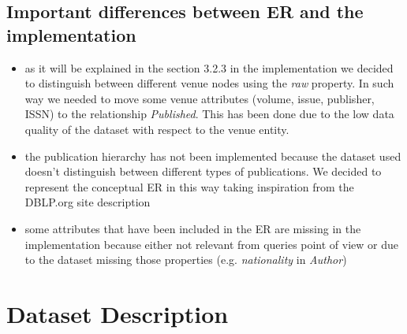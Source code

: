 \documentclass{Configuration_Files/PoliMi3i_thesis}
\begin{document}
\section{Important differences between ER and the implementation}
\begin{itemize}
    \item as it will be explained in the section 3.2.3 in the implementation we decided to distinguish between different venue
            nodes using the \emph{raw} property. In such way we needed to move some venue attributes (volume, issue, publisher, ISSN)
            to the relationship \emph{Published}. This has been done due to the low data quality of the dataset with respect to the venue entity.
    \item the publication hierarchy has not been implemented because the dataset used doesn't distinguish between different types of
            publications. We decided to represent the conceptual ER in this way taking inspiration from the DBLP.org site description
    \item some attributes that have been included in the ER are missing in the implementation because either not relevant from queries
            point of view or due to the dataset missing those properties (e.g. \emph{nationality} in \emph{Author})
\end{itemize}

\chapter{Dataset Description}
\end{document}
